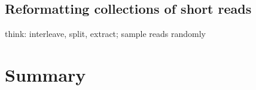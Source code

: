 \documentclass[10pt,a4paper,twocolumn]{article}
\begin{document}
\subsection*{Reformatting collections of short reads}

think: interleave, split, extract; sample reads randomly




\section*{Summary} %


\end{document}
